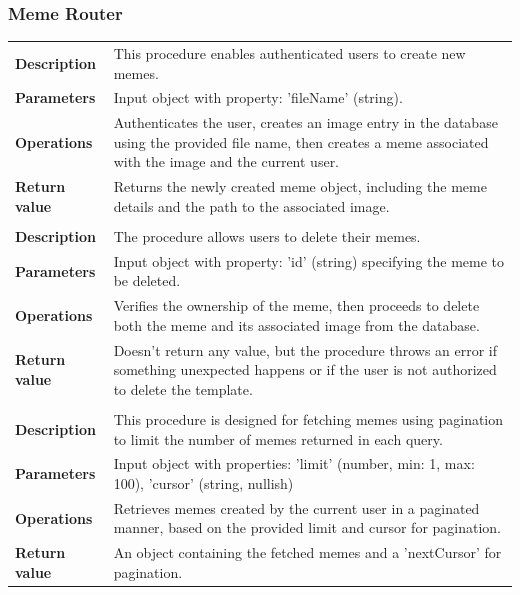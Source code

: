 \subsubsection{Meme Router}

\noindent
\begin{longtable}{@{}>{\raggedright\arraybackslash}p{3cm} p{11cm}}
    \hline
    \multicolumn{2}{c}{\textbf{createMeme}}
    \\
    \hline
    \textbf{Description}  & This procedure enables authenticated users to create new memes.
    \\
    \textbf{Parameters}   & Input object with property: 'fileName' (string).
    \\
    \textbf{Operations}   & Authenticates the user, creates an image entry in the database using the provided file name, then creates a meme associated with the image and the current user.
    \\
    \textbf{Return value} & Returns the newly created meme object, including the meme details and the path to the associated image.
    \\
    \hline
    \multicolumn{2}{c}{\textbf{deleteMeme}}
    \\
    \hline
    \textbf{Description}  & The procedure allows users to delete their memes.
    \\
    \textbf{Parameters}   & Input object with property: 'id' (string) specifying the meme to be deleted.
    \\
    \textbf{Operations}   & Verifies the ownership of the meme, then proceeds to delete both the meme and its associated image from the database.
    \\
    \textbf{Return value} & Doesn't return any value, but the procedure throws an error if something unexpected happens or if the user is not authorized to delete the template.
    \\
    \hline
    \multicolumn{2}{c}{\textbf{getInfiniteMemes}}
    \\
    \hline
    \textbf{Description}  & This procedure is designed for fetching memes using pagination to limit the number of memes returned in each query.
    \\
    \textbf{Parameters}   & Input object with properties: 'limit' (number, min: 1, max: 100), 'cursor' (string, nullish)
    \\
    \textbf{Operations}   & Retrieves memes created by the current user in a paginated manner, based on the provided limit and cursor for pagination.
    \\
    \textbf{Return value} & An object containing the fetched memes and a 'nextCursor' for pagination.
    \\
\end{longtable}

